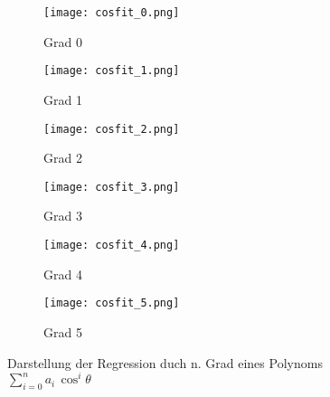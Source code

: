 \documentclass[12pt]{article}
\begin{document}
    \begin{figure}[H]\vspace*{-3.3cm}\hspace*{-1.5cm}
        \begin{subfigure}{0.4\textwidth}
        \texttt{[image: cosfit\_0.png]}
        \caption{Grad 0}
        \end{subfigure}
        \hfill
        \begin{subfigure}{0.4\textwidth}
        \hspace*{-0.8cm}
        \texttt{[image: cosfit\_1.png]}
        \caption{Grad 1}
        \end{subfigure}
        \hfill
        \hspace*{-1.5cm}
        \begin{subfigure}{0.4\textwidth}
        \texttt{[image: cosfit\_2.png]}
        \caption{Grad 2}
        \end{subfigure}
        \hfill
        \begin{subfigure}{0.4\textwidth}
            \hspace*{-0.8cm}
            \texttt{[image: cosfit\_3.png]}
            \caption{Grad 3}
            \end{subfigure}
            \hfill
            \hspace*{-1.5cm}
            \begin{subfigure}{0.4\textwidth}
            \texttt{[image: cosfit\_4.png]}
            \caption{Grad 4}
            \end{subfigure}
            \hfill
            \begin{subfigure}{0.4\textwidth}
                \hspace*{-0.8cm}
                \texttt{[image: cosfit\_5.png]}
                \caption{Grad 5}
                \end{subfigure}
                \hfill
        \caption{Darstellung der Regression duch n. Grad eines Polynoms $\sum_{i=0}^na_i\,\cos^i\theta$}
\end{figure}
\end{document}
